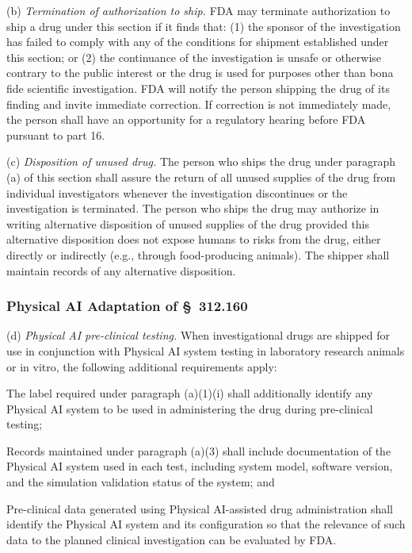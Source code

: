 (b) \textit{Termination of authorization to ship.} FDA may terminate authorization to ship a drug under this section if it finds that: (1) the sponsor of the investigation has failed to comply with any of the conditions for shipment established under this section; or (2) the continuance of the investigation is unsafe or otherwise contrary to the public interest or the drug is used for purposes other than bona fide scientific investigation. FDA will notify the person shipping the drug of its finding and invite immediate correction. If correction is not immediately made, the person shall have an opportunity for a regulatory hearing before FDA pursuant to part 16.

(c) \textit{Disposition of unused drug.} The person who ships the drug under paragraph (a) of this section shall assure the return of all unused supplies of the drug from individual investigators whenever the investigation discontinues or the investigation is terminated. The person who ships the drug may authorize in writing alternative disposition of unused supplies of the drug provided this alternative disposition does not expose humans to risks from the drug, either directly or indirectly (e.g., through food-producing animals). The shipper shall maintain records of any alternative disposition.

\subsubsection{Physical AI Adaptation of \S~312.160}

(d) \textit{Physical AI pre-clinical testing.} When investigational drugs are shipped for use in conjunction with Physical AI system testing in laboratory research animals or in vitro, the following additional requirements apply:

\begin{description}[leftmargin=0.8cm,style=sameline]
\item[(i)] The label required under paragraph (a)(1)(i) shall additionally identify any Physical AI system to be used in administering the drug during pre-clinical testing;
\item[(ii)] Records maintained under paragraph (a)(3) shall include documentation of the Physical AI system used in each test, including system model, software version, and the simulation validation status of the system; and
\item[(iii)] Pre-clinical data generated using Physical AI-assisted drug administration shall identify the Physical AI system and its configuration so that the relevance of such data to the planned clinical investigation can be evaluated by FDA.
\end{description}

